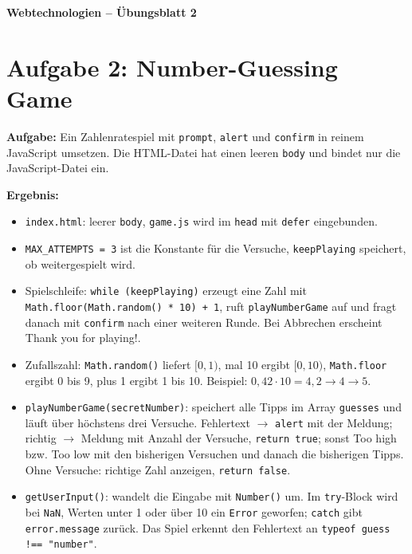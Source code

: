 \documentclass[11pt,a4paper]{article}
\begin{document}
\begin{center}
  {\Large\textbf{Webtechnologien -- Übungsblatt 2}}
\end{center}
\section*{Aufgabe 2: Number-Guessing Game}
\textbf{Aufgabe:} Ein Zahlenratespiel mit \texttt{prompt}, \texttt{alert}
und \texttt{confirm} in reinem JavaScript umsetzen. Die HTML-Datei hat
einen leeren \texttt{body} und bindet nur die JavaScript-Datei ein.

\medskip
\textbf{Ergebnis:}
\begin{itemize}
  \item \texttt{index.html}: leerer \texttt{body}, \texttt{game.js} wird im
    \texttt{head} mit \texttt{defer} eingebunden.
  \item \texttt{MAX\_ATTEMPTS = 3} ist die Konstante für die Versuche,
    \texttt{keepPlaying} speichert, ob weitergespielt wird.
  \item Spielschleife: \texttt{while (keepPlaying)} erzeugt eine Zahl mit
    \texttt{Math.floor(Math.random() * 10) + 1}, ruft
    \texttt{playNumberGame} auf und fragt danach mit \texttt{confirm} nach
    einer weiteren Runde. Bei \glqq Abbrechen\grqq{} erscheint
    \glqq Thank you for playing!\grqq.
  \item Zufallszahl: \texttt{Math.random()} liefert $[0,1)$, mal 10 ergibt
    $[0,10)$, \texttt{Math.floor} ergibt 0 bis 9, plus 1 ergibt 1 bis 10.
    Beispiel: $0{,}42 \cdot 10 = 4{,}2 \rightarrow 4 \rightarrow 5$.
  \item \texttt{playNumberGame(secretNumber)}: speichert alle Tipps im Array
    \texttt{guesses} und läuft über höchstens drei Versuche.
    Fehlertext $\rightarrow$ \texttt{alert} mit der Meldung;
    richtig $\rightarrow$ Meldung mit Anzahl der Versuche,
    \texttt{return true}; sonst \glqq Too high\grqq{} bzw.
    \glqq Too low\grqq{} mit den bisherigen Versuchen und danach die
    bisherigen Tipps. Ohne Versuche: richtige Zahl anzeigen,
    \texttt{return false}.
  \item \texttt{getUserInput()}: wandelt die Eingabe mit \texttt{Number()}
    um. Im \texttt{try}-Block wird bei \texttt{NaN}, Werten unter 1 oder
    über 10 ein \texttt{Error} geworfen; \texttt{catch} gibt
    \texttt{error.message} zurück. Das Spiel erkennt den Fehlertext an
    \texttt{typeof guess !== "number"}.
\end{itemize}
\end{document}
